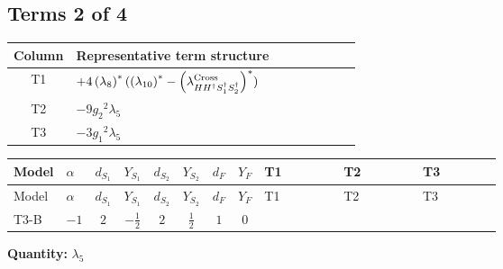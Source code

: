\documentclass[8pt]{article}
\begin{document}
\begin{landscape}
\subsection*{Terms 2 of 4}
\begin{center}
\begin{tabular}{@{}c >{\raggedright\arraybackslash}p{0.82\linewidth}@{}}
\toprule
Column & Representative term structure \\
\midrule
T1 & \(\displaystyle +4 \left({\lambda_8}\right)^{*} (\left({\lambda_{10}}\right)^{*}-\left({\lambda_{H H^\dagger S_1^\dagger S_2^\dagger}^{\rm Cross}}\right)^{*})\) \\
\midrule
T2 & \(\displaystyle -9 {g_2}^2 {\lambda_5}\) \\
\midrule
T3 & \(\displaystyle -3 {g_1}^2 {\lambda_5}\) \\
\midrule
\bottomrule
\end{tabular}
\end{center}
\smallskip
\tiny
\begin{longtable}{@{}llcccccc >{\raggedright\arraybackslash}p{0.21\linewidth} >{\raggedright\arraybackslash}p{0.21\linewidth} >{\raggedright\arraybackslash}p{0.21\linewidth}@{}}
\toprule
Model & $\alpha$ & $d_{S_1}$ & $Y_{S_1}$ & $d_{S_2}$ & $Y_{S_2}$ & $d_F$ & $Y_F$ & T1 & T2 & T3 \\
\midrule
\endfirsthead
\toprule
Model & $\alpha$ & $d_{S_1}$ & $Y_{S_1}$ & $d_{S_2}$ & $Y_{S_2}$ & $d_F$ & $Y_F$ & T1 & T2 & T3 \\
\midrule
\endhead
T3-B & $-1$ & $2$ & $-\frac{1}{2}$ & $2$ & $\frac{1}{2}$ & $1$ & $0$ & \scriptsize\adjustbox{max width=\linewidth}{$\begin{gathered} +4 \left({\lambda_8}\right)^{*} (\left({\lambda_{10}}\right)^{*}-\left({\lambda_{H H^\dagger S_1^\dagger S_2^\dagger}^{\rm Cross}}\right)^{*})\end{gathered}$} & \scriptsize\adjustbox{max width=\linewidth}{$\begin{gathered} -9 {g_2}^2 {\lambda_5}\end{gathered}$} & \scriptsize\adjustbox{max width=\linewidth}{$\begin{gathered} -3 {g_1}^2 {\lambda_5}\end{gathered}$} \\
\midrule
\bottomrule
\end{longtable}
\clearpage
\noindent\textbf{Quantity: }$\lambda_5$\par\smallskip

\end{landscape}
\end{document}
